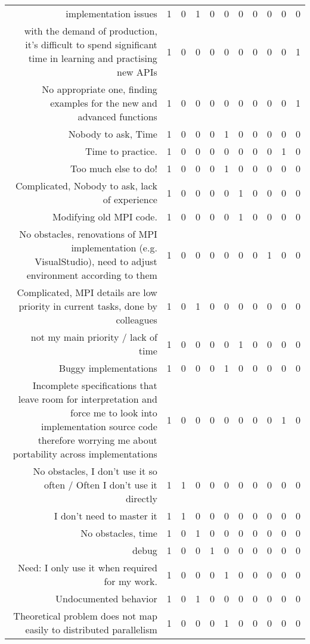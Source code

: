 {\begin{landscape}
\begin{longtable}[htb]{r|c|c|c|c|c|c|c|c|c|c}
{implementation issues} & 1 & 0 & 1 & 0 & 0 & 0 & 0 & 0 & 0 & 0 \\%
{with the demand of production, it's difficult to spend significant time in learning and practising new APIs} & 1 & 0 & 0 & 0 & 0 & 0 & 0 & 0 & 0 & 1 \\%
{No appropriate one, finding examples for the new and advanced functions} & 1 & 0 & 0 & 0 & 0 & 0 & 0 & 0 & 0 & 1 \\%
{Nobody to ask, Time} & 1 & 0 & 0 & 0 & 1 & 0 & 0 & 0 & 0 & 0 \\%
{Time to practice.} & 1 & 0 & 0 & 0 & 0 & 0 & 0 & 0 & 1 & 0 \\%
{Too much else to do!} & 1 & 0 & 0 & 0 & 1 & 0 & 0 & 0 & 0 & 0 \\%
{Complicated, Nobody to ask, lack of experience} & 1 & 0 & 0 & 0 & 0 & 1 & 0 & 0 & 0 & 0 \\%
{Modifying old MPI code.} & 1 & 0 & 0 & 0 & 0 & 1 & 0 & 0 & 0 & 0 \\%
{No obstacles, renovations of MPI implementation (e.g. VisualStudio), need to adjust environment according to them} & 1 & 0 & 0 & 0 & 0 & 0 & 0 & 1 & 0 & 0 \\%
{Complicated, MPI details are low priority in current tasks, done by colleagues} & 1 & 0 & 1 & 0 & 0 & 0 & 0 & 0 & 0 & 0 \\%
{not my main priority / lack of time} & 1 & 0 & 0 & 0 & 0 & 1 & 0 & 0 & 0 & 0 \\%
{Buggy implementations} & 1 & 0 & 0 & 0 & 1 & 0 & 0 & 0 & 0 & 0 \\%
{Incomplete specifications that leave room for interpretation and force me to look into implementation source code therefore worrying me about portability across implementations} & 1 & 0 & 0 & 0 & 0 & 0 & 0 & 0 & 1 & 0 \\%
{No obstacles, I don't use it so often / Often I don't use it directly} & 1 & 1 & 0 & 0 & 0 & 0 & 0 & 0 & 0 & 0 \\%
{I don't need to master it} & 1 & 1 & 0 & 0 & 0 & 0 & 0 & 0 & 0 & 0 \\%
{No obstacles, time} & 1 & 0 & 1 & 0 & 0 & 0 & 0 & 0 & 0 & 0 \\%
{debug} & 1 & 0 & 0 & 1 & 0 & 0 & 0 & 0 & 0 & 0 \\%
{Need: I only use it when required for my work.} & 1 & 0 & 0 & 0 & 1 & 0 & 0 & 0 & 0 & 0 \\%
{Undocumented behavior} & 1 & 0 & 1 & 0 & 0 & 0 & 0 & 0 & 0 & 0 \\%
{Theoretical problem does not map easily to distributed parallelism} & 1 & 0 & 0 & 0 & 1 & 0 & 0 & 0 & 0 & 0 \\%

\end{longtable}
\end{landscape}}
